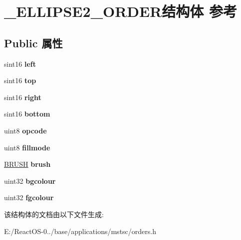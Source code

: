 \hypertarget{struct___e_l_l_i_p_s_e2___o_r_d_e_r}{}\section{\+\_\+\+E\+L\+L\+I\+P\+S\+E2\+\_\+\+O\+R\+D\+E\+R结构体 参考}
\label{struct___e_l_l_i_p_s_e2___o_r_d_e_r}
\subsection*{Public 属性}
\begin{DoxyCompactItemize}
\item 
\mbox{\label{struct___e_l_l_i_p_s_e2___o_r_d_e_r_ab8efdae091c1b75a63e0044fecb289bf}} 
sint16 {\bfseries left}
\item 
\mbox{\label{struct___e_l_l_i_p_s_e2___o_r_d_e_r_a1daa0d0f9c47e5577966181a32c4926c}} 
sint16 {\bfseries top}
\item 
\mbox{\label{struct___e_l_l_i_p_s_e2___o_r_d_e_r_a6f7727fd2a03ae6bc5f35631c3b60fc1}} 
sint16 {\bfseries right}
\item 
\mbox{\label{struct___e_l_l_i_p_s_e2___o_r_d_e_r_a3cc797f69233a73b468121e8d77d525f}} 
sint16 {\bfseries bottom}
\item 
\mbox{\label{struct___e_l_l_i_p_s_e2___o_r_d_e_r_a61d433fe4bea6b453367e68c6170e448}} 
uint8 {\bfseries opcode}
\item 
\mbox{\label{struct___e_l_l_i_p_s_e2___o_r_d_e_r_a35658b6a7dd39197c28649a26566b2b2}} 
uint8 {\bfseries fillmode}
\item 
\mbox{\label{struct___e_l_l_i_p_s_e2___o_r_d_e_r_af9ff1e01a027a537365b2423703afbb2}} 
\hyperlink{class_b_r_u_s_h}{B\+R\+U\+SH} {\bfseries brush}
\item 
\mbox{\label{struct___e_l_l_i_p_s_e2___o_r_d_e_r_a5c09829146cdf9a7060e827e5a964814}} 
uint32 {\bfseries bgcolour}
\item 
\mbox{\label{struct___e_l_l_i_p_s_e2___o_r_d_e_r_a70a9971e793a2d76e9e056f2d2568620}} 
uint32 {\bfseries fgcolour}
\end{DoxyCompactItemize}


该结构体的文档由以下文件生成\+:\begin{DoxyCompactItemize}
\item 
E\+:/\+React\+O\+S-\/0../base/applications/mstsc/orders.\+h\end{DoxyCompactItemize}
